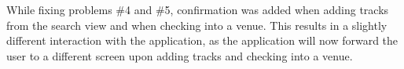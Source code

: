 While fixing problems \#4 and \#5, confirmation was added when adding
tracks from the search view and when checking into a venue. This results in a slightly different
interaction with the application, as the application will now forward
the user to a different screen upon adding tracks and checking into a venue.
